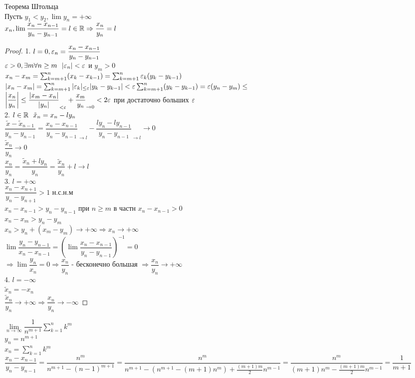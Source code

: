 \begin{theorem} Теорема Штольца \\
	Пусть $ y_1 < y_2, \lim y_n =  +\infty $ \\
	$ x_n, \lim \dfrac{x_n - x_{n-1}}{y_n - y_{n-1}} = l \in \mathbb{R} \Rightarrow \dfrac{x_n}{y_n} = l $
	\begin{proof}
		1. $ l = 0, \varepsilon_n = \dfrac{x_n - x_{n-1}}{y_n - y_{n-1}} $ \\
		$ \eps > 0, \exists m \forall n \geq m \ \ |\eps_n | < \eps $ и $ y_m > 0 $\\
		$ x_n - x_m = \sum_{k=m+1}^{n} (x_k - x_{k-1}) = \sum_{k=m+1}^{n} \varepsilon_k (y_k - y_{k-1}) $ \\
		$ |x_n - x_m| = \sum_{k=m+1}^{n} |\varepsilon_k|_{\leq \varepsilon} | y_k - y_{k-1}| < \varepsilon \sum_{k=m+1}^n (y_k - y_{k-1}) = \varepsilon (y_n - y_m) \leq  $ \\
		$ \left| \dfrac{x_n}{y_n} \right| \leq \dfrac{|x_m - x_n |}{|y_n|}_{<\varepsilon} + \dfrac{x_m}{y_n}_{\rightarrow 0} <  2\varepsilon $ при достаточно больших $ \varepsilon $ \\
		2. $ l \in \mathbb{R} \ \ \tilde{x}_n = x_n - ly_n $ \\
		$ \dfrac{\tilde{x} - \tilde{x}_{n-1}}{y_n - y_{n-1}} = \dfrac{x_n - x_{n-1}}{y_n - y_{n-1}}_{\rightarrow l} - \dfrac{ly_n - ly_{n-1}}{y_n - y_{n-1}}_{\rightarrow l} \rightarrow 0 $ \\
		$ \dfrac{\tilde{x}_n}{y_n} \rightarrow 0$ \\
		$ \dfrac{x_n}{y_n} = \dfrac{\tilde{x}_n + ly_n}{y_n} = \dfrac{\tilde{x}_n}{y_n} + l \rightarrow l $ \\
		3. $ l = +\infty $ \\
		$ \dfrac{x_n - x_{n+1}}{y_n - y_{n+1}} > 1 $ н.с.н.м \\
		$ x_n - x_{n-1} > y_n - y_{n-1} $ при $ n \geq m$ в частн $ x_n - x_{n-1} > 0 $ \\
		$ x_n - x_m > y_n - y_m $ \\
		$ x_n > y_n + (x_m - y_m) \rightarrow +\infty \Rightarrow x_n \rightarrow +\infty $ \\
		$ \lim \dfrac{y_n - y_{n-1}}{x_n - x_{n-1}} = \left( \lim \dfrac{x_n - x_{n-1}}{y_n - y_{n-1}} \right)^{-1} = 0 $ \\
		$ \Rightarrow \lim \dfrac{y_n}{x_n} = 0 \Rightarrow \dfrac{x_n}{y_n} $ - бесконечно большая $ \Rightarrow \dfrac{x_n}{y_n} \rightarrow +\infty $ \\
		4. $ l = -\infty $ \\
		$ \tilde{x}_n = -x_n $ \\
		$ \dfrac{\tilde{x}_n}{y_n} \rightarrow +\infty \Rightarrow \dfrac{x_n}{y_n} \rightarrow -\infty $
	\end{proof}
\end{theorem}
$ \lim\limits_{n \rightarrow \infty} \dfrac{1}{n^{m+1}} \sum_{k=1}^{n} k^m $ \\
$ y_n = n^{m+1} $ \\
$ x_n = \sum_{k=1}^{n} k^m $ \\
$ \dfrac{x_n - x_{n-1}}{y_n - y_{n-1}} = \dfrac{n^m}{n^{m+1}- (n-1)^{m+1}} = \dfrac{n^m}{n^{m+1} - (n^{m+1} - (m+1)n^m) + \frac{(m+1)m}{2} n^{m-1}} = \dfrac{n^m}{(m+1) n^m - \frac{(m+1)m}{2} n^{m-1} } = \dfrac{1}{m+1} $ \\
	
